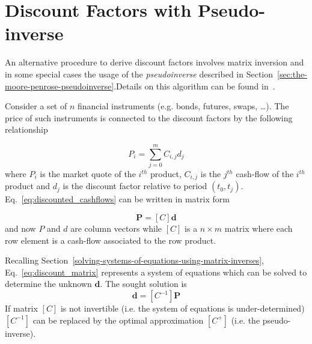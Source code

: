 \section{Discount Factors with Pseudo-inverse}
An alternative procedure to derive discount factors involves matrix inversion and in some special cases the usage of the \emph{pseudoinverse} described in Section~\ref{sec:the-moore-penrose-pseudoinverse}.Details on this algorithm can be found in~\cite{bib:boostrap_pseudoinv}.

Consider a set of $n$ financial instruments (e.g. bonds, futures, swaps, \ldots). The price of such instruments is connected to the discount factors by the following relationship

\begin{equation}
P_i = \sum_{j=0}^{m} C_{i,j} d_j
\label{eq:discounted_cashflows}
\end{equation}
where $P_i$ is the market quote of the $i^{th}$ product, $C_{i,j}$ is the $j^{th}$ cash-flow of the $i^{th}$ product and $d_j$ is the discount factor relative to period $(t_0, t_j)$.
Eq.~\ref{eq:discounted_cashflows} can be written in matrix form

\begin{equation}
\boldsymbol{P} = [C]\boldsymbol{d}
\label{eq:discount_matrix}
\end{equation}
and now $P$ and $d$ are column vectors while $[C]$ is a $n \times m$ matrix where each row element is a cash-flow associated to the row product.

Recalling Section~\ref{solving-systems-of-equations-using-matrix-inverses}, Eq.~\ref{eq:discount_matrix} represents a system of equations which can be solved to determine the unknown $\boldsymbol{d}$.
The sought solution is 
\begin{equation}
\boldsymbol{d} = [C^{-1}] \boldsymbol{P}
\end{equation} 
If matrix $[C]$ is not invertible (i.e. the system of equations is under-determined) $[C^{-1}]$ can be replaced by the optimal approximation $[C^+]$ (i.e. the pseudo-inverse). 

